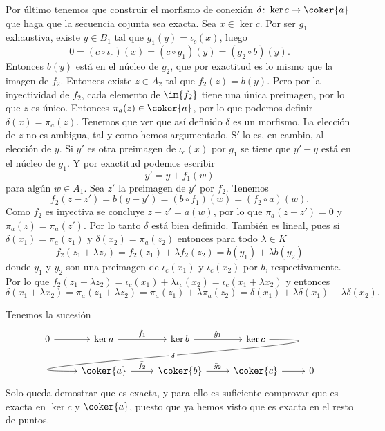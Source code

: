 \documentclass[12pt]{article}
\begin{document}
Por último tenemos que construir el morfismo de conexión \( \delta \colon \ker{c} \to
\coker{a} \) que haga que la secuencia cojunta sea exacta. Sea \( x \in \ker{c} \). Por
ser \( g_1 \) exhaustiva, existe \( y \in B_1 \) tal que \( g_1(y) = \iota_c(x) \), luego
\begin{equation*}
	0 = (c \circ \iota_c)(x) = (c \circ g_1)(y) = (g_2 \circ b)(y).
\end{equation*}
Entonces \( b(y) \) está en el núcleo de \( g_2 \), que por exactitud es lo mismo que la
imagen de \( f_2 \). Entonces existe \( z \in A_2 \) tal que \( f_2(z) = b(y) \). Pero por
la inyectividad de \( f_2 \), cada elemento de \( \im{f_2} \) tiene una única preimagen,
por lo que \( z \) es único. Entonces \( \pi_a(z) \in \coker{a} \), por lo que podemos
definir \( \delta(x) = \pi_a(z) \). Tenemos que ver que así definido \( \delta \) es un
morfismo. La elección de \( z \) no es ambigua, tal y como hemos argumentado. Sí lo es, en
cambio, al elección de \( y \). Si \( y' \) es otra preimagen de \( \iota_c(x) \) por \(
g_1 \) se tiene que \( y' - y \) está en el núcleo de \( g_1 \). Y por exactitud podemos
escribir
\begin{equation*}
	y' = y + f_1(w)
\end{equation*}
para algún \( w \in A_1 \). Sea \( z' \) la preimagen de \( y' \) por \( f_2 \). Tenemos
\begin{equation*}
	f_2(z - z') = b(y - y') = (b \circ f_1)(w) = (f_2 \circ a)(w). 
\end{equation*}
Como \( f_2 \) es inyectiva se concluye \( z - z' = a(w) \), por lo que \( \pi_a(z - z') =
0 \) y \( \pi_a(z) = \pi_a(z') \). Por lo tanto \( \delta \) está bien definido. También
es lineal, pues si \( \delta(x_1) = \pi_a(z_1) \) y \( \delta(x_2) = \pi_a(z_2) \)
entonces para todo \( \lambda \in K \) 
\begin{equation*}
	f_2(z_1 + \lambda z_2) = f_2(z_1) + \lambda f_2(z_2) = b(y_1) + \lambda b(y_2)
\end{equation*}
donde \( y_1 \) y \( y_2 \) son una preimagen de \( \iota_c(x_1) \) y \( \iota_c(x_2) \)
por \( b \), respectivamente. Por lo que \( f_2(z_1 + \lambda z_2) = \iota_c(x_1) +
\lambda \iota_c(x_2) = \iota_c(x_1 + \lambda x_2) \) y entonces \( \delta(x_1 + \lambda
x_2) = \pi_a(z_1 + \lambda z_2) = \pi_a(z_1) + \lambda \pi_a(z_2) = \delta(x_1) + \lambda
\delta(x_1) + \lambda \delta(x_2). \)

Tenemos la sucesión
\begin{equation*}
	\begin{tikzcd}
		0 \arrow[r] & \ker{a} \arrow[r, "\hat{f}_1"] & \ker{b} \arrow[r, "\hat{g}_1"] &
		\ker{c} \arrow[dll, "\delta" description, out=0, in=180, looseness=2, overlay] \\ &
		\coker{a} \arrow[r, "\bar{f}_2"] & \coker{b} \arrow[r, "\bar{g}_2"] & \coker{c}
		\arrow[r] & 0
	\end{tikzcd}
\end{equation*}
Solo queda demostrar que es exacta, y para ello es suficiente comprovar que es exacta en
\( \ker{c} \) y \( \coker{a} \), puesto que ya hemos visto que es exacta en el resto de
puntos. 
\end{document}
